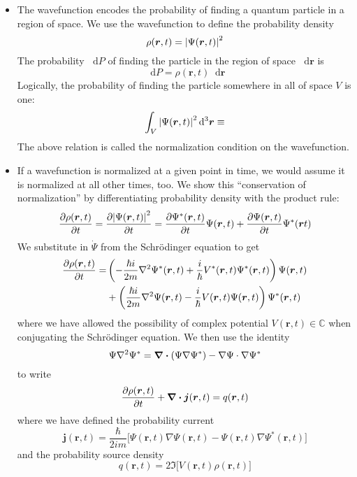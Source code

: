 \documentclass[11pt, a4paper]{article}
\newcommand{\diff}{\mathop{}\!\mathrm{d}} %
\newcommand{\dr}{\diff^{3} \r}  %
\renewcommand{\grad}{\nabla}
\newcommand{\Schro}{Schr\"{o}dinger\xspace}
\renewcommand{\vec}[1]{\bm{#1}} %
\renewcommand{\r}{\vec{r}}  %
\renewcommand{\P}{\Psi}  %
\begin{document}
\begin{itemize}
	\item The wavefunction encodes the probability of finding a quantum particle in a region of space. We use the wavefunction to define the probability density
	\begin{equation*}
		\rho (\r, t) = \abs{\P(\r, t)}^{2}
	\end{equation*}
	The probability $ \diff P $ of finding the particle in the region of space $ \diff \r $ is
	\begin{equation*}
		\diff P = \rho(\r, t) \diff \r
	\end{equation*}
	Logically, the probability of finding the particle somewhere in all of space $ V $ is one:
	\begin{equation*}
		\int_{V} \abs{\P(\r, t)}^{2}\dr \equiv
	\end{equation*}
	The above relation is called the normalization condition on the wavefunction.
	
	\item If a wavefunction is normalized at a given point in time, we would assume it is normalized at all other times, too. We show this ``conservation of normalization'' by differentiating probability density with the product rule:
	\begin{align*}
		  \pdv{\rho(\r, t)}{t} = \pdv{\abs{\P(\r, t)}^{2}}{t} &= \pdv{\P^{*}(\r, t)}{t} \P(\r, t) + \pdv{\P(\r, t)}{t} \P^{*}(\r t)\\
	\end{align*}
	We substitute in $ \dot{\P} $ from the \Schro equation to get
	\begin{align*}
		\pdv{\rho(\r, t)}{t} = &\left(- \frac{\hbar i}{2m}\laplacian \P^{*}(\r, t) + \frac{i}{\hbar} V^{*}(\r, t)\Psi^{*}(\r, t)\right)\P(\r, t) \\
		& + \left(\frac{\hbar i}{2m}\laplacian \P(\r, t) - \frac{i}{\hbar} V(\r, t)\Psi(\r, t)\right)\Psi^{*}(\r, t)
	\end{align*}
	where we have allowed the possibility of complex potential $ V(\r, t) \in \mathbb{C} $ when conjugating the \Schro equation. We then use the identity
	\begin{equation*}
		\P \laplacian \P^{*} = \div (\P \grad \P^{*}) - \grad \P \cdot \grad \P^{*}
	\end{equation*}
	to write 
	\begin{equation*}
		\pdv{\rho(\r, t)}{t} + \div \vec{j}(\r, t) = q(\r, t)
	\end{equation*}
	where we have defined the probability current
	\begin{equation*}
		\vec{j}(\r, t) = \frac{\hbar}{2im}\big[\P(\r, t)\grad\P(\r, t) - \P(\r, t)\grad\P^{*}(\r, t)\big]
	\end{equation*}
	and the probability source density
	\begin{equation*}
		q(\r, t) = 2 \Im \big[V(\r, t)\rho(\r, t)\big]
	\end{equation*}
	

\end{itemize}
\end{document}
